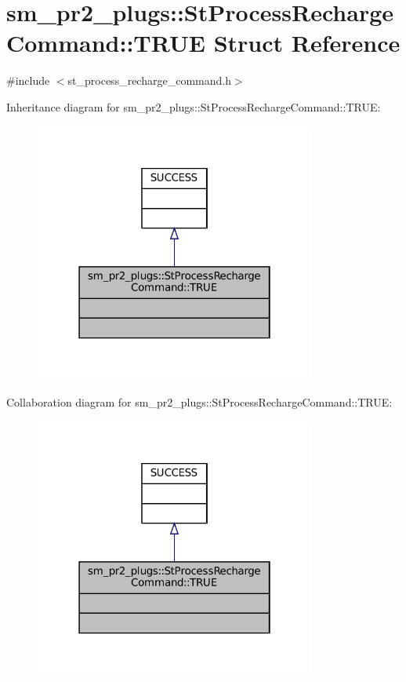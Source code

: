 \hypertarget{structsm__pr2__plugs_1_1StProcessRechargeCommand_1_1TRUE}{}\section{sm\+\_\+pr2\+\_\+plugs\+:\+:St\+Process\+Recharge\+Command\+:\+:T\+R\+UE Struct Reference}
\label{structsm__pr2__plugs_1_1StProcessRechargeCommand_1_1TRUE}


{\ttfamily \#include $<$st\+\_\+process\+\_\+recharge\+\_\+command.\+h$>$}



Inheritance diagram for sm\+\_\+pr2\+\_\+plugs\+:\+:St\+Process\+Recharge\+Command\+:\+:T\+R\+UE\+:
\nopagebreak
\begin{figure}[H]
\begin{center}
\leavevmode
\includegraphics[width=262pt]{structsm__pr2__plugs_1_1StProcessRechargeCommand_1_1TRUE__inherit__graph}
\end{center}
\end{figure}


Collaboration diagram for sm\+\_\+pr2\+\_\+plugs\+:\+:St\+Process\+Recharge\+Command\+:\+:T\+R\+UE\+:
\nopagebreak
\begin{figure}[H]
\begin{center}
\leavevmode
\includegraphics[width=262pt]{structsm__pr2__plugs_1_1StProcessRechargeCommand_1_1TRUE__coll__graph}
\end{center}
\end{figure}


